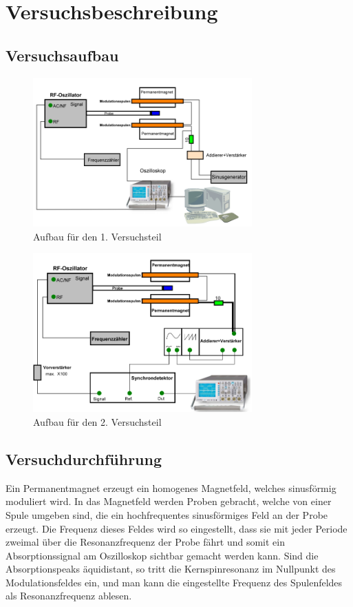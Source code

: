\section{Versuchsbeschreibung}

\subsection{Versuchsaufbau}

\begin{figure}[H]
\centering \includegraphics[width= 0.75\textwidth]{Bilder/aufbau1.png}
\caption{Aufbau für den 1. Versuchsteil}
\end{figure}

\begin{figure}[H]
\centering \includegraphics[width=0.75\textwidth]{Bilder/aufbau2.png}
\caption{Aufbau für den 2. Versuchsteil}
\end{figure}

\subsection{Versuchdurchführung}

Ein Permanentmagnet erzeugt ein homogenes Magnetfeld, welches sinusförmig moduliert wird. In das Magnetfeld werden Proben gebracht, welche von einer Spule umgeben sind, die ein hochfrequentes sinusförmiges Feld an der Probe erzeugt. Die Frequenz dieses Feldes wird so eingestellt, dass sie mit jeder Periode zweimal über die Resonanzfrequenz der Probe fährt und somit ein Absorptionssignal am Oszilloskop sichtbar gemacht werden kann. Sind die Absorptionspeaks äquidistant, so tritt die Kernspinresonanz im Nullpunkt des Modulationsfeldes ein, und man kann die eingestellte Frequenz des Spulenfeldes als Resonanzfrequenz ablesen.

